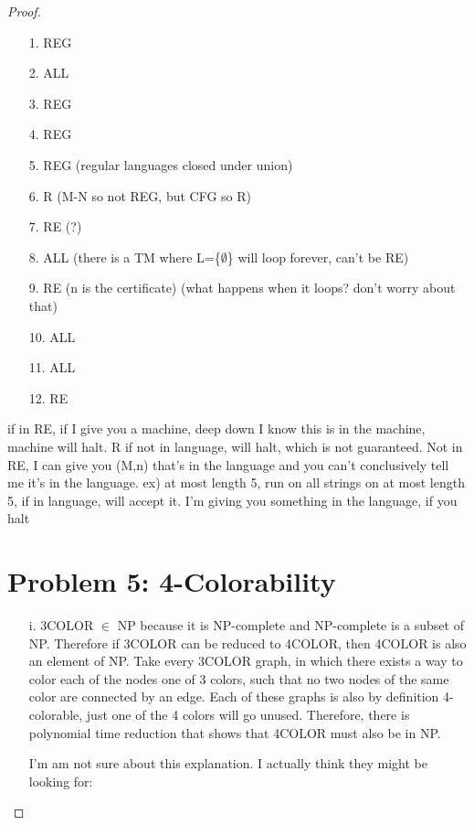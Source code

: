 \documentclass[10pt,letter]{article}
\begin{document}
\begin{proof}
\begin{enumerate}
\item[1.] REG
\item[2.] ALL
\item[3.] REG
\item[4.] REG
\item[5.] REG (regular languages closed under union)
\item[6.] R (M-N so not REG, but CFG so R)
\item[7.] RE (?)
\item[8.] ALL (there is a TM where L=\{$\emptyset$\} will loop forever, can't be RE)
\item[9.] RE (n is the certificate) (what happens when it loops? don't worry about that)
\item[10.] ALL
\item[11.] ALL
\item[12.] RE 
\end{enumerate}
if in RE, if I give you a machine, deep down I know this is in the machine, machine will halt. R if not in language, will halt, which is not guaranteed. Not in RE, I can give you (M,n) that's in the language and you can't conclusively tell me it's in the language. ex) at most length 5, run on all strings on at most length 5, if in language, will accept it. I'm giving you something in the language, if you halt

\section*{Problem 5: 4-Colorability}
\begin{enumerate}
\item[i.] 3COLOR $\in$ NP because it is NP-complete and NP-complete is a subset of NP. Therefore if 3COLOR can be reduced to 4COLOR, then 4COLOR is also an element of NP. Take every 3COLOR graph, in which there exists a way to color each of the nodes one of 3 colors, such that no two nodes of the same color are connected by an edge. Each of these graphs is also by definition 4-colorable, just one of the 4 colors will go unused. Therefore, there is polynomial time reduction that shows that 4COLOR must also be in NP. 

I'm am not sure about this explanation. I actually think they might be looking for: 


\end{enumerate}
\end{proof}
\end{document}
